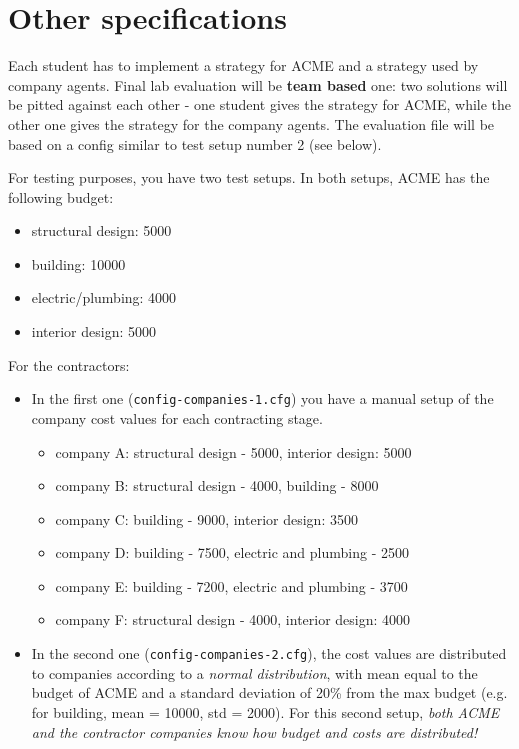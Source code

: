 \documentclass[a4paper, 12pt, twoside]{article}
\begin{document}
\section{Other specifications}
Each student has to implement a strategy for ACME and a strategy used by company agents.
Final lab evaluation will be \textbf{team based} one: two solutions will be pitted against each other - one student gives the strategy for ACME, while the other one gives the strategy for the company agents.
The evaluation file will be based on a config similar to test setup number 2 (see below).


For testing purposes, you have two test setups. In both setups, ACME has the following budget:
\begin{itemize}\footnotesize
	\item structural design: 5000
	\item building: 10000
	\item electric/plumbing: 4000
	\item interior design: 5000
\end{itemize}

For the contractors:
\begin{itemize}
	\item In the first one (\texttt{config-companies-1.cfg}) you have a manual setup of the company cost values for each contracting stage.
		\begin{itemize}
			\item company A: structural design - 5000, interior design: 5000
			\item company B: structural design - 4000, building - 8000
			\item company C: building - 9000, interior design: 3500
			\item company D: building - 7500, electric and plumbing - 2500
			\item company E: building - 7200, electric and plumbing - 3700
			\item company F: structural design - 4000, interior design: 4000
		\end{itemize}
	\item In the second one (\texttt{config-companies-2.cfg}), the cost values are distributed to companies according to a \emph{normal distribution}, with mean equal to the budget of ACME and a standard deviation of 20\% from the max budget (e.g. for building, mean = 10000, std = 2000). For this second setup, \textit{both ACME and the contractor companies know how budget and costs are distributed!}
	
\end{itemize}
\end{document}
